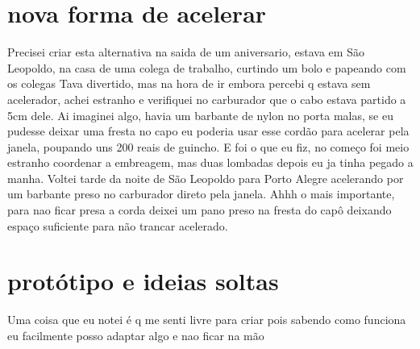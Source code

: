 \documentclass[a4paper]{report}
\begin{document}
\section*{nova forma de acelerar}
Precisei criar esta alternativa na saida de um aniversario, estava em S\~ao Leopoldo, na casa de uma colega de trabalho, curtindo um bolo e papeando com os colegas
Tava divertido, mas na hora de ir embora percebi q estava sem acelerador, achei estranho e verifiquei no carburador que o cabo estava partido a 5cm dele.
Ai imaginei algo, havia um barbante de nylon no porta malas, se eu pudesse deixar uma fresta no capo eu poderia usar esse cord\~ao para acelerar pela janela, poupando uns 200 reais de guincho.
E foi o que eu fiz, no come\c{c}o foi meio estranho coordenar a embreagem, mas duas lombadas depois eu ja tinha pegado a manha.
Voltei tarde da noite de S\~ao Leopoldo para Porto Alegre acelerando por um barbante preso no carburador direto pela janela.
Ahhh o mais importante, para nao ficar presa a corda deixei um pano preso na fresta do cap\^o deixando espa\c{c}o suficiente para n\~ao trancar acelerado. 

\section*{prot\'otipo e ideias soltas}
Uma coisa que eu notei \'e q me senti livre para criar pois sabendo como funciona eu facilmente posso adaptar algo e nao ficar na m\~ao

\clearpage

\printindex
 
\end{document}
